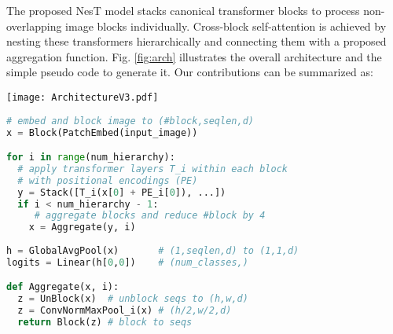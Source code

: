 \documentclass{article}
\newcommand{\OURS}{NesT\xspace}
\begin{document}
The proposed \OURS model stacks canonical transformer blocks to process non-overlapping image blocks individually. 
Cross-block self-attention is achieved by nesting these transformers hierarchically and connecting them with a proposed aggregation function.
Fig. \ref{fig:arch} illustrates the overall architecture and the simple pseudo code to generate it. Our contributions can be summarized as:
\begin{figure*}[t]
\begin{minipage}[t]{0.52\textwidth}
   \centering
\texttt{[image: ArchitectureV3.pdf]} 
 
\end{minipage}
\begin{minipage}[t]{0.47\textwidth}
\vspace{-6.cm}
\makeatletter
\renewcommand{\ALG@name}{}
\renewcommand{\thealgorithm}{Pseudo code}
\makeatother
\begin{algorithm}[H]
\small
\caption{\small \OURS}
\label{alg:code}
\begin{lstlisting}[language=python]
# embed and block image to (#block,seqlen,d)
x = Block(PatchEmbed(input_image))

for i in range(num_hierarchy):
  # apply transformer layers T_i within each block
  # with positional encodings (PE)
  y = Stack([T_i(x[0] + PE_i[0]), ...])
  if i < num_hierarchy - 1: 
     # aggregate blocks and reduce #block by 4
    x = Aggregate(y, i)
    
h = GlobalAvgPool(x)       # (1,seqlen,d) to (1,1,d)
logits = Linear(h[0,0])    # (num_classes,)

def Aggregate(x, i):
  z = UnBlock(x)  # unblock seqs to (h,w,d)
  z = ConvNormMaxPool_i(x) # (h/2,w/2,d)
  return Block(z) # block to seqs
\end{lstlisting}
\end{algorithm}

\end{minipage}

\caption{
(Left) Illustration of \OURS with nested transformer hierarchy; (right) the simple pseudo code to generate the architecture. 
Each node Ti processes an image block. 
The block aggregation is performed between hierarchies (numhierarchy here) to achieve cross-block communication on the image (feature map) plane. }
\label{fig:arch}
\end{figure*} 
\end{document}
